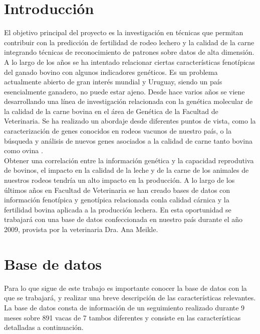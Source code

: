 \documentclass[12pt,a4paper,titlepage]{report}
\begin{document}
\tableofcontents

\chapter{Introducción}
El objetivo principal del proyecto es la investigación en técnicas que permitan contribuir con la predicción de fertilidad de rodeo lechero y la calidad de la carne integrando técnicas de reconocimiento de patrones sobre datos de alta dimensión.\\

A lo largo de los años se ha intentado relacionar ciertas características fenotípicas del ganado bovino con algunos indicadores genéticos. Es un problema actualmente abierto de gran interés mundial y Uruguay, siendo un país esencialmente ganadero, no puede estar ajeno. Desde hace varios años se viene desarrollando una línea de investigación relacionada con la genética molecular de la calidad de la carne bovina en el área de Genética de la Facultad de Veterinaria. Se ha realizado un abordaje desde diferentes puntos de vista, como la caracterización de genes conocidos en rodeos vacunos de nuestro país, o la búsqueda y análisis de nuevos genes asociados a la calidad de carne tanto bovina como ovina \cite{bib:eileen}.\\

Obtener una correlación entre la información genética y la capacidad reprodutiva de bovinos, el impacto en la calidad de la leche y de la carne de los animales de nuestros rodeos tendría un alto impacto en la producción. A lo largo de los últimos años en Facultad de Veterinaria se han creado bases de datos con información fenotípica y genotípica relacionada conla calidad cárnica y la fertilidad bovina aplicada a la producción lechera. En esta oportunidad se trabajará con una base de datos confeccionada en nuestro país durante el año 2009, provista por la veterinaria Dra. Ana Meikle.

\chapter{Base de datos}
Para lo que sigue de este trabajo es importante conocer la base de datos con la que se trabajará, y realizar una breve descripción de las características relevantes.\\

La base de datos consta de información de un seguimiento realizado durante 9 meses sobre 891 vacas de 7 tambos diferentes y consiste en las características detalladas a continuación.
\end{document}
